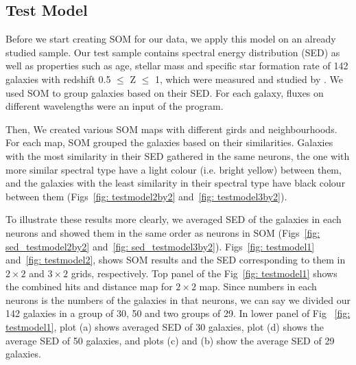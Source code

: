  \subsection{Test Model}
 \label{sec: test model}
    Before we start creating SOM for our data, we apply this model on an already studied sample. 
    Our test sample contains spectral energy distribution (SED) as well as properties such as age, stellar mass and specific star formation rate of 142 galaxies with redshift 0.5 $ \leq$ Z $\leq $ 1, which were measured and studied by \cite{Hossein12}. 
    We used SOM to group galaxies based on their SED. For each galaxy, fluxes on different wavelengths were an input of the program.
    
    Then, We created various SOM maps with different girds and neighbourhoods. 
    For each map, SOM grouped the galaxies based on their similarities. 
    Galaxies with the most similarity in their SED gathered in the same neurons, the one with more similar spectral type have a light colour (i.e. bright yellow) between them, and the galaxies with the least similarity in their spectral type have black colour between them (Figs~\ref{fig: testmodel2by2} and~\ref{fig: testmodel3by2}).
    
    To illustrate these results more clearly, we averaged SED of the galaxies in each neurons and showed them in the same order as neurons in SOM (Figs~\ref{fig: sed_testmodel2by2} and~\ref{fig: sed_testmodel3by2}). 
    Figs~\ref{fig: testmodel1} and~\ref{fig: testmodel2}, shows SOM results and the SED corresponding to them in $2\times2$ and $3\times2$ grids, respectively.  
    Top panel of the Fig~\ref{fig: testmodel1} shows the combined hits and distance map for  $2\times2$ map. Since numbers in each neurons is the numbers of the galaxies in that neurons, we can say we divided our 142 galaxies in a group of 30, 50 and two groups of 29. In lower panel of Fig ~\ref{fig: testmodel1}, plot (a) shows averaged SED of 30 galaxies, plot (d) shows the average SED of 50 galaxies, and plots (c) and (b) show the average SED of 29 galaxies. 
    
